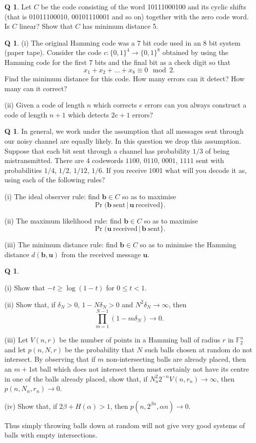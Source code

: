 \documentclass[12pt,a4paper]{article}
\theoremstyle{plain}
\theoremstyle{definition}
\newtheorem{question}[theorem]{Q}
\begin{document}
\begin{question}\label{C2.10}
Let $C$ be the code consisting of the
word 10111000100 and its cyclic shifts (that is
01011100010, 00101110001 and so on) together with
the zero code word. Is $C$ linear? Show that $C$
has minimum distance 5.
\end{question}
\begin{question}\label{C2.11} 
(i) The original Hamming code
was a $7$ bit code used in an $8$ bit system
(paper tape). Consider the code $c:\{0,1\}^{4}\rightarrow\{0,1\}^{8}$
obtained by using the Hamming code for the first $7$ bits
and the final bit as a check digit so that
\[x_{1}+x_{2}+\dots+x_{8}\equiv 0\mod{2}.\]
Find the minimum distance for this code. How many errors
can it detect? How many can it correct?

(ii) Given a code of length $n$ which corrects $e$ errors
can you always construct a code of length $n+1$
which detects $2e+1$ errors?
\end{question}
\begin{question}\label{C2.12} In general,
we work under the assumption
that all messages sent through our noisy channel
are equally likely. In this question
we drop this assumption. Suppose that
each bit sent through a channel has probability
$1/3$ of being mistransmitted. There are $4$
codewords $1100$, $0110$, $0001$, $1111$
sent with probabilities $1/4$, $1/2$, $1/12$, $1/6$.
If you receive $1001$ what will you decode it as, using
each of the following rules?

(i) The ideal observer rule: find ${\mathbf b}\in C$
so as to maximise 
\[\Pr({\mathbf b}\ \text{sent}\,|\,
{\mathbf u}\ \text{received}\}.\]

(ii) The maximum likelihood rule: find ${\mathbf b}\in C$
so as to maximise 
\[\Pr({\mathbf u}\ \text{received}\,|\,
{\mathbf b}\ \text{sent}\}.\] 

(iii) The minimum distance rule: find ${\mathbf b}\in C$
so as to minimise the Hamming distance 
$d({\mathbf b},{\mathbf u})$ from the 
received message ${\mathbf u}$.
\end{question}
\begin{question}\label{E;random ball}\label{C2.13}

(i) Show that $-t\geq \log(1-t)$ for $0\leq t<1$.

(ii) Show that, if $\delta_{N}>0$, $1-N\delta_{N}>0$ and
$N^{2}\delta_{N}\rightarrow\infty$, then
\[\prod_{m=1}^{N-1}(1-m\delta_{N})\rightarrow 0.\]

(iii) Let $V(n,r)$ be the number of points in a Hamming
ball of radius $r$ in ${\mathbb F}_{2}^{n}$ and
let $p(n,N,r)$ be the probability that $N$ such 
balls chosen at random do not intersect.
By observing that if $m$ non-intersecting
balls are already placed, then an $m+1$st ball
which does not intersect them
must certainly not have its centre
in one of the balls already placed,
show that, if $N_{n}^{2}2^{-n}V(n,r_{n})\rightarrow\infty$,
then  $p(n,N_{n},r_{n})\rightarrow 0$.

(iv) Show that,
if $2\beta+H(\alpha)>1$, 
then $p(n,2^{\beta n},\alpha n)\rightarrow 0$.

Thus simply throwing balls down at random will not
give very good systems of balls with empty intersections.
\end{question}  
\end{document}
